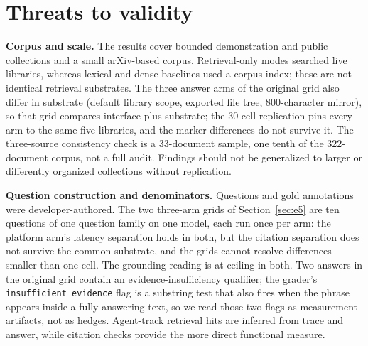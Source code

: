 \section{Threats to validity}
\label{sec:threats}

\noindent\textbf{Corpus and scale.} The results cover bounded demonstration and public
collections and a small arXiv-based corpus. Retrieval-only modes searched live
libraries, whereas lexical and dense baselines used a corpus index; these are
not identical retrieval substrates. The three answer arms of the original
grid also differ in substrate (default library scope, exported file tree,
800-character mirror), so that grid compares interface plus substrate; the
30-cell replication pins every arm to the same five libraries, and the marker
differences do not survive it. The three-source consistency
check is a 33-document sample, one tenth of the 322-document corpus, not a full
audit. Findings should not be generalized to larger or differently organized
collections without replication.

\noindent\textbf{Question construction and denominators.} Questions and gold
annotations were developer-authored. The two three-arm grids of
Section~\ref{sec:e5} are ten questions of one question family on one model,
each run once per arm: the platform arm's latency separation holds in both,
but the citation separation does not survive the common substrate, and the
grids cannot resolve differences smaller than one cell. The grounding reading
is at ceiling in both. Two answers in the original grid contain
an evidence-insufficiency qualifier; the grader's
\texttt{insufficient\_evidence} flag is a substring test that also fires when
the phrase appears inside a fully answering text, so we read those two flags
as measurement artifacts, not as hedges. Agent-track retrieval
hits are inferred from trace and answer, while citation checks provide the
more direct functional measure.


